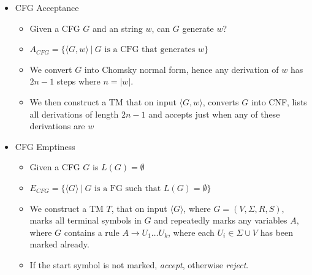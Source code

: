\documentclass{article}
\newcommand{\encode}[1]{\langle #1 \rangle}
\begin{document}
\begin{itemize}
\begin{itemize}
            \end{itemize}
        \item CFG Acceptance
            \begin{itemize}
                \item Given a CFG $G$ and an string $w$, can $G$ generate $w$?
                \item $A_{CFG} = \{ \encode{G, w} \ | \ \text{$G$ is a CFG that generates $w$} \}$ 
                \item We convert $G$ into Chomsky normal form, hence any derivation of $w$ has $2n - 1$ steps where $n = |w|$. 
                \item We then construct a TM that on input $\encode{G, w}$, converts $G$ into CNF, lists all derivations of length $2n - 1$ and accepts just when any of these derivations are $w$
            \end{itemize}
        \item CFG Emptiness
            \begin{itemize}
                \item Given a CFG $G$ is $L(G) = \emptyset$
                \item $E_{CFG} = \{ \encode{G} \ | \ \text{$G$ is a FG such that $L(G) = \emptyset$} \}$
                \item We construct a TM $T$, that on input $\encode{G}$, where $G = (V, \Sigma, R, S)$, marks all terminal symbols in $G$ and repeatedly marks any variables $A$, where $G$ contains a rule $A \to U_1 \ldots U_k$, where each $U_i \in \Sigma \cup V$ has been marked already.
                \item If the start symbol is not marked, \textit{accept}, otherwise \textit{reject}. 
            \end{itemize}
    \end{itemize}
\end{document}
